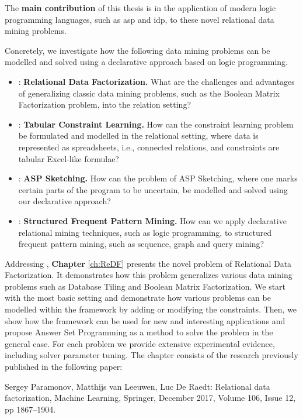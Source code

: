 The \textbf{main contribution} of this thesis is in the application of
modern logic programming languages, such as \acrshort{asp} and
\acrshort{idp}, to these novel relational data mining problems.


Concretely, we investigate how the following data mining problems
can be modelled and solved using a declarative approach based on
logic programming.
\begin{itemize}
    \item \cone: \textbf{Relational Data Factorization.} What are the challenges and advantages of generalizing
    classic data mining problems, such as the Boolean Matrix
    Factorization problem, into the relation setting?
  \item \ctwo: \textbf{Tabular Constraint Learning.} How can the constraint learning problem be formulated
   and modelled in the relational setting, where data is
   represented as spreadsheets, i.e., connected relations, and constraints are
   tabular Excel-like formulae?
  \item \cthree: \textbf{ASP Sketching.} How can the problem of ASP
      Sketching, where one marks certain parts of the
        program to be uncertain, be modelled and solved using our
        declarative approach? 
   \item \cfour: \textbf{Structured Frequent Pattern Mining.}
    How can we apply declarative relational mining
    techniques, such as logic programming, to structured frequent pattern mining, such as sequence, graph
    and query mining?
\end{itemize}

Addressing \cone, \textbf{Chapter} \ref{ch:ReDF} presents the novel problem of Relational Data
Factorization. It demonstrates how this problem generalizes various
data mining problems such as Database Tiling and Boolean Matrix
Factorization. We start with the most basic setting and demonstrate
how various problems can be modelled within the framework by adding
or modifying the constraints. Then, we show how the framework can be
used for new and interesting applications and propose Answer Set
Programming as a method to solve the problem in the general case.
For each problem we provide extensive experimental evidence,
including solver parameter tuning. The chapter consists of the
research previously published in the following paper:

\begin{addmargin}[2em]{2em}

Sergey Paramonov,  Matthijs van Leeuwen, Luc De Raedt: Relational data
factorization, Machine Learning, Springer, December 2017, Volume 106,
    Issue 12, pp 1867–1904.

\end{addmargin}



